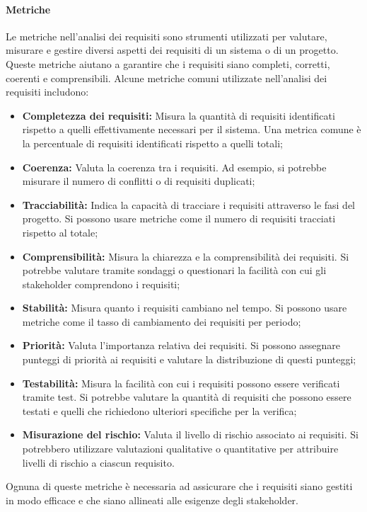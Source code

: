 \paragraph{Metriche}
Le metriche nell'analisi dei requisiti sono strumenti utilizzati per valutare, misurare e gestire diversi aspetti dei requisiti di un sistema o di un progetto. Queste metriche aiutano a garantire che i requisiti siano completi, corretti, coerenti e comprensibili. Alcune metriche comuni utilizzate nell'analisi dei requisiti includono:
\begin{itemize}
    \item \textbf{Completezza dei requisiti:} Misura la quantità di requisiti identificati rispetto a quelli effettivamente necessari per il sistema. Una metrica comune è la percentuale di requisiti identificati rispetto a quelli totali;
    \item \textbf{Coerenza:} Valuta la coerenza tra i requisiti. Ad esempio, si potrebbe misurare il numero di conflitti o di requisiti duplicati;
    \item \textbf{Tracciabilità:} Indica la capacità di tracciare i requisiti attraverso le fasi del progetto. Si possono usare metriche come il numero di requisiti tracciati rispetto al totale;
    \item \textbf{Comprensibilità:} Misura la chiarezza e la comprensibilità dei requisiti. Si potrebbe valutare tramite sondaggi o questionari la facilità con cui gli stakeholder comprendono i requisiti;
    \item \textbf{Stabilità:} Misura quanto i requisiti cambiano nel tempo. Si possono usare metriche come il tasso di cambiamento dei requisiti per periodo;
    \item \textbf{Priorità:} Valuta l'importanza relativa dei requisiti. Si possono assegnare punteggi di priorità ai requisiti e valutare la distribuzione di questi punteggi;
    \item \textbf{Testabilità:} Misura la facilità con cui i requisiti possono essere verificati tramite test. Si potrebbe valutare la quantità di requisiti che possono essere testati e quelli che richiedono ulteriori specifiche per la verifica;
    \item \textbf{Misurazione del rischio:} Valuta il livello di rischio associato ai requisiti. Si potrebbero utilizzare valutazioni qualitative o quantitative per attribuire livelli di rischio a ciascun requisito.
\end{itemize}
Ognuna di queste metriche è necessaria ad assicurare che i requisiti siano gestiti in modo efficace e che siano allineati alle esigenze degli stakeholder.


